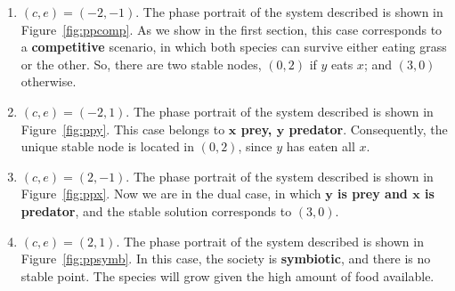 \begin{enumerate}
\item $(c,e) = (-2, -1)$. The phase portrait of the system described is shown in Figure~\ref{fig:ppcomp}. As we show in the first section, this case corresponds to a \textbf{competitive} scenario, in which both species can survive either eating grass or the other. So, there are two stable nodes, $(0,2)$ if $y$ eats $x$; and $(3,0)$ otherwise.
\item $(c,e) = (-2, 1)$. The phase portrait of the system described is shown in Figure~\ref{fig:ppy}. This case belongs to \textbf{$\boldsymbol x$ prey, $\boldsymbol y$ predator}. Consequently, the unique stable node is located in $(0,2)$, since $y$ has eaten all $x$.
\item $(c,e) = (2, -1)$. The phase portrait of the system described is shown in Figure~\ref{fig:ppx}. Now we are in the dual case, in which \textbf{$\boldsymbol y$ is prey and $\boldsymbol x$ is predator}, and the stable solution corresponds to $(3,0)$.
\item $(c,e) = (2, 1)$. The phase portrait of the system described is shown in Figure~\ref{fig:ppsymb}. In this case, the society is \textbf{symbiotic}, and there is no stable point. The species will grow given the high amount of food available.
\end{enumerate}
